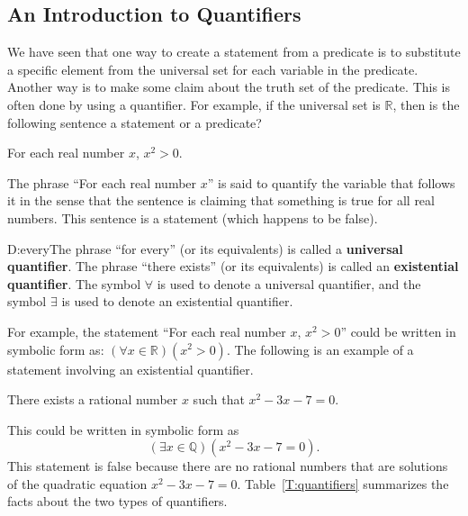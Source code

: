 \subsection*{An Introduction to Quantifiers}
%
We have seen that one way to create a statement from a predicate is to substitute a specific element from the universal set for each variable in the predicate.  Another way is to make some claim about the truth set of the predicate.  This is often done by using a quantifier.    For example, if the universal set is  $\mathbb{R}$, then is the following sentence a statement or a predicate?
\begin{center}
For each real number  $x$,  $x^2 > 0$.
\end{center}
The phrase ``For each real number  $x$'' is said to quantify the variable that follows it in the sense that the sentence is claiming that something is true for all real numbers.  This sentence is a statement (which happens to be false).
%
\begin{defbox}{D:every}{The phrase ``for every'' (or its equivalents) is called a \textbf{universal quantifier}.
%
%
  The phrase ``there exists'' (or its equivalents) is called an \textbf{existential quantifier}.
%
%
  The symbol $\forall$ 
\label{sym:forall}%
 is used to denote a universal quantifier, and the symbol  $\exists $ 
\label{sym:exist}%
 is used to denote an existential quantifier.}
\end{defbox}
%
For example, the statement ``For each real number  $x$,  $x^2 > 0$'' could be written in symbolic form as: $\left( {\forall x \in \mathbb{R}} \right)\left( {x^2 > 0} \right)$.
The following is an example of a statement involving an existential quantifier.
\begin{center}
There exists a rational number $x$ such that  $x^2  - 3x - 7 = 0$.
\end{center}
This could be written in symbolic form as
\[
\left( {\exists x \in \mathbb{Q}} \right)\left( {x^2  - 3x - 7 = 0} \right).
\]
This statement is false because there are no rational numbers that are solutions of the quadratic equation $x^2  - 3x - 7 = 0$.
Table~\ref{T:quantifiers} summarizes the facts about the two types of quantifiers.


